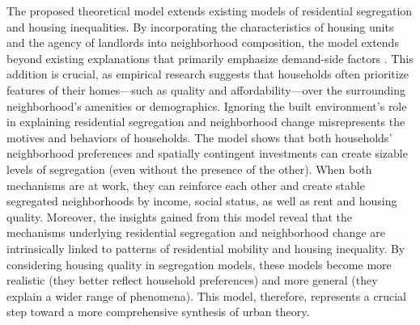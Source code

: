 \documentclass[a4paper,12pt]{article}
\begin{document}
The proposed theoretical model extends existing models of residential segregation and housing inequalities. By incorporating the characteristics of housing units and the agency of landlords into neighborhood composition, the model extends beyond existing explanations that primarily emphasize demand-side factors \citep{desmondPoorPayMore2019, rosenthalChangePersistenceEconomic2015}. This addition is crucial, as empirical research suggests that households often prioritize features of their homes—such as quality and affordability—over the surrounding neighborhood's amenities or demographics. Ignoring the built environment's role in explaining residential segregation and neighborhood change misrepresents the motives and behaviors of households. The model shows that both households' neighborhood preferences and spatially contingent investments can create sizable levels of segregation (even without the presence of the other). When both mechanisms are at work, they can reinforce each other and create stable segregated neighborhoods by income, social status, as well as rent and housing quality. Moreover, the insights gained from this model reveal that the mechanisms underlying residential segregation and neighborhood change are intrinsically linked to patterns of residential mobility and housing inequality. By considering housing quality in segregation models, these models become more realistic (they better reflect household preferences) and more general (they explain a wider range of phenomena). This model, therefore, represents a crucial step toward a more comprehensive synthesis of urban theory.


\end{document}
